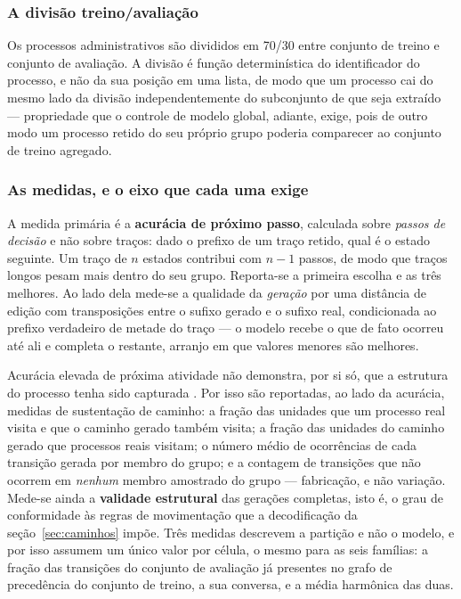 \subsubsection*{A divisão treino/avaliação}

Os processos administrativos são divididos em 70/30 entre conjunto de treino e conjunto de avaliação. A
divisão é função determinística do identificador do processo, e não da sua posição em uma lista, de
modo que um processo cai do mesmo lado da divisão independentemente do subconjunto de que seja
extraído --- propriedade que o controle de modelo global, adiante, exige, pois de outro modo um
processo retido do seu próprio grupo poderia comparecer ao conjunto de treino agregado.

\subsubsection*{As medidas, e o eixo que cada uma exige}

A medida primária é a \textbf{acurácia de próximo passo}, calculada sobre \emph{passos de decisão}
e não sobre traços: dado o prefixo de um traço retido, qual é o estado seguinte. Um traço de $n$
estados contribui com $n-1$ passos, de modo que traços longos pesam mais dentro do seu grupo.
Reporta-se a primeira escolha e as três melhores. Ao lado dela mede-se a qualidade da \emph{geração}
por uma distância de edição com transposições entre o sufixo gerado e o sufixo real, condicionada ao
prefixo verdadeiro de metade do traço --- o modelo recebe o que de fato ocorreu até ali e completa o
restante, arranjo em que valores menores são melhores.

Acurácia elevada de próxima atividade não demonstra, por si só, que a estrutura do processo tenha
sido capturada \cite{peeperkorn2023rnnstructure}. Por isso são reportadas, ao lado da acurácia,
medidas de sustentação de caminho: a fração das unidades que um processo real visita e que o
caminho gerado também visita; a fração das unidades do caminho gerado que processos reais visitam;
o número médio de ocorrências de cada transição gerada por membro do grupo; e a contagem de
transições que não ocorrem em \emph{nenhum} membro amostrado do grupo --- fabricação, e não
variação. Mede-se ainda a \textbf{validade estrutural} das gerações completas, isto é, o grau de
conformidade às regras de movimentação que a decodificação da seção~\ref{sec:caminhos} impõe. Três
medidas descrevem a partição e não o modelo, e por isso assumem um único valor por célula, o mesmo
para as seis famílias: a fração das transições do conjunto de avaliação já presentes no grafo de
precedência do conjunto de treino, a sua conversa, e a média harmônica das duas.

